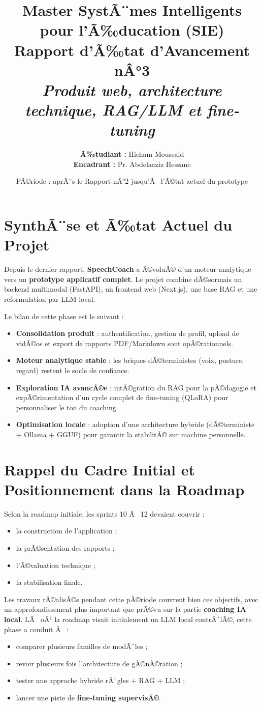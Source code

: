 ﻿\documentclass[12pt,a4paper]{article}
\title{
    \vspace{-2cm}
    \large Master SystÃ¨mes Intelligents pour l'Ã‰ducation (SIE)\\
    \vspace{0.5cm}
    \huge \textbf{Rapport d'Ã‰tat d'Avancement nÂ°3}\\
    \large \textit{Produit web, architecture technique, RAG/LLM et fine-tuning}
}
\author{\textbf{Ã‰tudiant :} Hicham Moussaid \\ \textbf{Encadrant :} Pr. Abdelaaziz Hessane}
\date{PÃ©riode : aprÃ¨s le Rapport nÂ°2 jusqu'Ã  l'Ã©tat actuel du prototype}
\begin{document}
\maketitle

\section{SynthÃ¨se et Ã‰tat Actuel du Projet}
Depuis le dernier rapport, \textbf{SpeechCoach} a Ã©voluÃ© d'un moteur analytique vers un \textbf{prototype applicatif complet}. Le projet combine dÃ©sormais un backend multimodal (FastAPI), un frontend web (Next.js), une base RAG et une reformulation par LLM local.

Le bilan de cette phase est le suivant :
\begin{itemize}
    \item \textbf{Consolidation produit} : authentification, gestion de profil, upload de vidÃ©os et export de rapports PDF/Markdown sont opÃ©rationnels.
    \item \textbf{Moteur analytique stable} : les briques dÃ©terministes (voix, posture, regard) restent le socle de confiance.
    \item \textbf{Exploration IA avancÃ©e} : intÃ©gration du RAG pour la pÃ©dagogie et expÃ©rimentation d'un cycle complet de fine-tuning (QLoRA) pour personnaliser le ton du coaching.
    \item \textbf{Optimisation locale} : adoption d'une architecture hybride (dÃ©terministe + Ollama + GGUF) pour garantir la stabilitÃ© sur machine personnelle.
\end{itemize}

\section{Rappel du Cadre Initial et Positionnement dans la Roadmap}
Selon la roadmap initiale, les sprints 10 Ã  12 devaient couvrir :
\begin{itemize}
    \item la construction de l'application ;
    \item la prÃ©sentation des rapports ;
    \item l'Ã©valuation technique ;
    \item la stabilisation finale.
\end{itemize}

Les travaux rÃ©alisÃ©s pendant cette pÃ©riode couvrent bien ces objectifs, avec un approfondissement plus important que prÃ©vu sur la partie \textbf{coaching IA local}. LÃ  oÃ¹ la roadmap visait initialement un LLM local contrÃ´lÃ©, cette phase a conduit Ã  :
\begin{itemize}
    \item comparer plusieurs familles de modÃ¨les ;
    \item revoir plusieurs fois l'architecture de gÃ©nÃ©ration ;
    \item tester une approche hybride rÃ¨gles + RAG + LLM ;
    \item lancer une piste de \textbf{fine-tuning supervisÃ©}.
\end{itemize}
\end{document}
